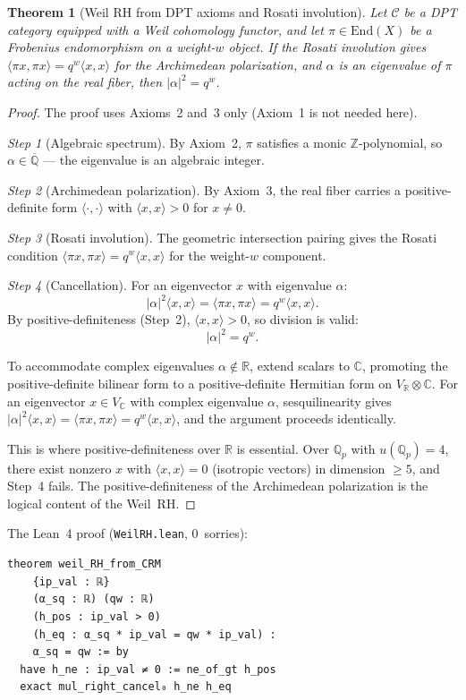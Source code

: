 \documentclass[11pt]{article}
\newtheorem{theorem}{Theorem}[section]
\theoremstyle{definition}
\theoremstyle{remark}
\newcommand{\Z}{\mathbb{Z}}
\newcommand{\Q}{\mathbb{Q}}
\newcommand{\R}{\mathbb{R}}
\newcommand{\C}{\mathbb{C}}
\newcommand{\Qbar}{\overline{\Q}}
\newcommand{\Qp}{\Q_p}
\newcommand{\ip}[2]{\langle #1, #2 \rangle}
\begin{document}
\begin{theorem}[Weil RH from DPT axioms and Rosati involution]
\label{thm:A}
Let $\mathcal{C}$ be a DPT category equipped with a Weil cohomology functor, and let $\pi \in \mathrm{End}(X)$ be a Frobenius endomorphism on a weight-$w$ object. If the Rosati involution gives $\ip{\pi x}{\pi x} = q^w \ip{x}{x}$ for the Archimedean polarization, and $\alpha$ is an eigenvalue of $\pi$ acting on the real fiber, then $|\alpha|^2 = q^w$.
\end{theorem}

\begin{proof}
The proof uses Axioms~2 and~3 only (Axiom~1 is not needed here).

\emph{Step 1} (Algebraic spectrum). By Axiom~2, $\pi$ satisfies a monic $\Z$-polynomial, so $\alpha \in \Qbar$ --- the eigenvalue is an algebraic integer.

\emph{Step 2} (Archimedean polarization). By Axiom~3, the real fiber carries a positive-definite form $\ip{\cdot}{\cdot}$ with $\ip{x}{x} > 0$ for $x \neq 0$.

\emph{Step 3} (Rosati involution). The geometric intersection pairing gives the Rosati condition $\ip{\pi x}{\pi x} = q^w \ip{x}{x}$ for the weight-$w$ component.

\emph{Step 4} (Cancellation). For an eigenvector $x$ with eigenvalue $\alpha$:
\[
|\alpha|^2 \ip{x}{x} = \ip{\pi x}{\pi x} = q^w \ip{x}{x}.
\]
By positive-definiteness (Step~2), $\ip{x}{x} > 0$, so division is valid:
\[
|\alpha|^2 = q^w.
\]

\noindent To accommodate complex eigenvalues $\alpha \notin \R$, extend scalars to $\C$, promoting the positive-definite bilinear form to a positive-definite Hermitian form on $V_\R \otimes \C$. For an eigenvector $x \in V_\C$ with complex eigenvalue $\alpha$, sesquilinearity gives $|\alpha|^2 \ip{x}{x} = \ip{\pi x}{\pi x} = q^w \ip{x}{x}$, and the argument proceeds identically.

\noindent This is where positive-definiteness over $\R$ is essential. Over $\Qp$ with $u(\Qp) = 4$, there exist nonzero $x$ with $\ip{x}{x} = 0$ (isotropic vectors) in dimension $\geq 5$, and Step~4 fails. The positive-definiteness of the Archimedean polarization is the logical content of the Weil~RH.
\end{proof}

The Lean~4 proof (\texttt{WeilRH.lean}, 0~sorries):

\begin{lstlisting}
theorem weil_RH_from_CRM
    {ip_val : ℝ}
    (α_sq : ℝ) (qw : ℝ)
    (h_pos : ip_val > 0)
    (h_eq : α_sq * ip_val = qw * ip_val) :
    α_sq = qw := by
  have h_ne : ip_val ≠ 0 := ne_of_gt h_pos
  exact mul_right_cancel₀ h_ne h_eq
\end{lstlisting}
\end{document}
